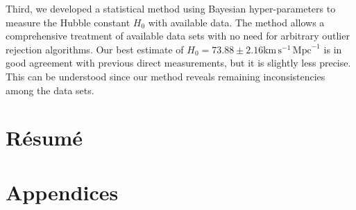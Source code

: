 \documentclass[12pt]{report}
\newcommand{\km}{\mathrm{km}}
\newcommand{\second}{\mathrm{s}}
\newcommand{\Mpc}{\mathrm{Mpc}}
\renewcommand{\(}{\left(}
\renewcommand{\)}{\right)}
\renewcommand{\[}{\left[}
\renewcommand{\]}{\right]}
\begin{document}
Third, we developed a statistical method using Bayesian hyper-parameters to measure the Hubble constant $H_0$ with available data. The method allows a comprehensive treatment of available data sets with no need for arbitrary outlier rejection algorithms. Our best estimate of $H_0 = 73.88 \pm 2.16 \km\, \second^{-1}\, \Mpc^{-1}$ is in good agreement with previous direct measurements, but it is slightly less precise. This can be understood since our method reveals remaining inconsistencies among the data sets. 

\newpage

\chapter*{R\'{e}sum\'{e}}  

\vspace{3mm}



\tableofcontents



\newpage




%

%









\chapter*{Appendices}  

\appendix





%

%


%


%
\end{document}
